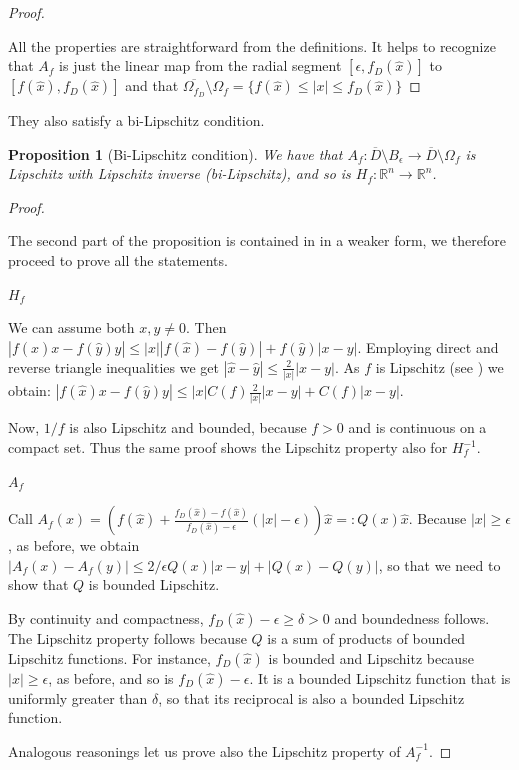\documentclass[english,a4paper,9pt,oneside]{scrbook}	%
\theoremstyle{break}
\newtheorem{prop}[equation]{Proposition}
\newenvironment{mproof}[1][\proofname]{%
  \begin{proof}[#1]$ $\par\nobreak\ignorespaces
}{%
  \end{proof}
}
\renewcommand*{\proofname}{Proof}
\theoremstyle{remark}
\newcommand{\mR}{\mathbb{R}}
\newcommand{\xh}{\hat{x}}
\newcommand{\yh}{\hat{y}}
\newcommand{\eps}{\epsilon}
\begin{document}
\begin{mproof}
All the properties are straightforward from the definitions. It helps to recognize that $A_f$ is just the linear map from the radial segment $[\eps, f_D(\xh)]$ to $[f(\xh), f_D(\xh)]$ and that $\overline{\Omega_{f_D}} \setminus \Omega_f = \{f(\xh)\leq|x|\leq f_D(\xh)\}$
\end{mproof}

They also satisfy a bi-Lipschitz condition.

\begin{prop}[Bi-Lipschitz condition]
We have that $A_f:  \overline{D}\setminus B_\eps\rightarrow \overline{D}\setminus \Omega_f $ is Lipschitz with Lipschitz inverse (bi-Lipschitz), and so is $H_f: \mR^n \rightarrow \mR^n$.
\end{prop}

\begin{mproof}

The second part of the proposition is contained in \cite{deckelnick} in a weaker form, we therefore proceed to prove all the statements.

\underline{$H_f$}

We can assume both $x,y\neq 0$. Then $|f(\xh)x-f(\yh)y|\leq |x||f(\xh)-f(\yh)|+f(\yh)|x-y|$. Employing direct and reverse triangle inequalities we get $|\xh-\yh|\leq \frac{2}{|x|}|x-y|$.
As $f$ is Lipschitz (see \cite{deckelnick}) we obtain:  $|f(\xh)x-f(\yh)y|\leq |x|C(f)\frac{2}{|x|}|x-y|+C(f)|x-y|$.

Now, $1/f$ is also Lipschitz and bounded, because $f>0$ and is continuous on a compact set. Thus the same proof shows the Lipschitz property also for $H_f^{-1}$.

\underline{$A_f$}

Call $A_f(x)=\left (  f(\xh)+\frac{f_D(\xh)-f(\xh)}{f_D(\xh)-\eps}(|x|-\eps) \right )\xh =:Q(x)\xh $. Because $|x|\geq\eps$, as before, we obtain $|A_f(x)-A_f(y)|\leq 2/\eps Q(x) |x-y|+|Q(x)-Q(y)|$, so that we need to show that $Q$ is bounded Lipschitz.

By continuity and compactness, $f_D(\xh)-\eps\geq \delta >0$ and boundedness follows. The Lipschitz property follows because $Q$ is a sum of products of bounded Lipschitz functions. For instance, $f_D(\xh)$ is bounded and Lipschitz because $|x|\geq\eps$, as before, and so is $f_D(\xh)-\eps$. It is a bounded Lipschitz function that is uniformly greater than $\delta$, so that its reciprocal is also a bounded Lipschitz function.

Analogous reasonings let us prove also the Lipschitz property of $A_f^{-1}$.
\end{mproof}
\end{document}
